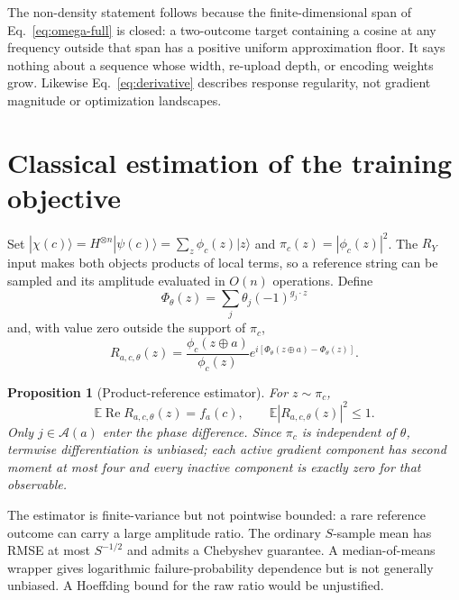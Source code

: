 \documentclass[a4paper,twocolumn,11pt,unpublished]{quantumarticle}
\newtheorem{proposition}{Proposition}
\newcommand{\E}{\mathbb{E}}
\begin{document}
The non-density statement follows because the finite-dimensional span of
Eq.~\eqref{eq:omega-full} is closed: a two-outcome target containing a cosine
at any frequency outside that span has a positive uniform approximation
floor.  It says nothing about a sequence whose width, re-upload depth, or
encoding weights grow.  Likewise Eq.~\eqref{eq:derivative} describes response
regularity, not gradient magnitude or optimization landscapes.

\section{Classical estimation of the training objective}
\label{sec:estimator}

Set $|\chi(c)\rangle=H^{\otimes n}|\psi(c)\rangle
=\sum_z\phi_c(z)|z\rangle$ and $\pi_c(z)=|\phi_c(z)|^2$.  The $R_Y$ input makes
both objects products of local terms, so a reference string can be sampled and
its amplitude evaluated in $O(n)$ operations.  Define
\begin{equation}
 \Phi_\theta(z)=\sum_j\theta_j(-1)^{g_j\cdot z}
\end{equation}
and, with value zero outside the support of $\pi_c$,
\begin{equation}
 R_{a,c,\theta}(z)=
 \frac{\phi_c(z\oplus a)}{\phi_c(z)}
 e^{i[\Phi_\theta(z\oplus a)-\Phi_\theta(z)]}.
 \label{eq:ratio}
\end{equation}

\begin{proposition}[Product-reference estimator]
\label{prop:estimator}
For $z\sim\pi_c$,
\begin{equation}
 \E\operatorname{Re}R_{a,c,\theta}(z)=f_a(c),\qquad
 \E|R_{a,c,\theta}(z)|^2\leq1.
 \label{eq:second-moment}
\end{equation}
Only $j\in\mathcal A(a)$ enter the phase difference.  Since $\pi_c$ is
independent of $\theta$, termwise differentiation is unbiased; each active
gradient component has second moment at most four and every inactive component
is exactly zero for that observable.
\end{proposition}

The estimator is finite-variance but not pointwise bounded: a rare reference
outcome can carry a large amplitude ratio.  The ordinary $S$-sample mean has
RMSE at most $S^{-1/2}$ and admits a Chebyshev guarantee.  A median-of-means
wrapper gives logarithmic failure-probability dependence but is not generally
unbiased.  A Hoeffding bound for the raw ratio would be unjustified.
\end{document}
